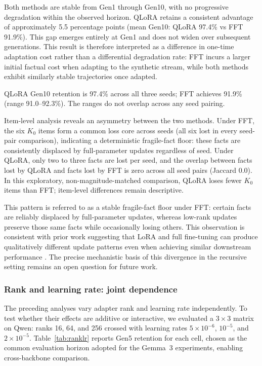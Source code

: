 \documentclass[a4paper,fleqn]{cas-dc}
\newif\ifshowchanges
\newcommand{\rev}[1]{\ifshowchanges{\color{blue}#1}\else{#1}\fi}
\begin{document}
Both methods are stable from Gen1 through Gen10, with no progressive degradation
within the observed horizon. QLoRA retains a consistent advantage of
approximately 5.5 percentage points (mean Gen10: QLoRA 97.4\% vs FFT 91.9\%).
This gap emerges entirely at Gen1 and does not widen over subsequent generations.
This result is therefore interpreted as a difference in one-time adaptation cost rather than
a differential degradation rate: FFT incurs a larger initial factual cost when
adapting to the synthetic stream, while both methods exhibit similarly stable
trajectories once adapted.

QLoRA Gen10 retention is 97.4\% across all three seeds; FFT achieves
91.9\% (range 91.0--92.3\%). The ranges do not overlap across any seed pairing.

Item-level analysis reveals an asymmetry between the two methods. Under FFT, the
\rev{six $K_0$ items form a common loss core across seeds (all six lost in every seed-pair comparison), indicating a deterministic fragile-fact floor:} these facts are
consistently displaced by full-parameter updates regardless of seed. Under
QLoRA, only two to three facts are lost per seed, and the overlap between facts
lost by QLoRA and facts lost by FFT is zero across all seed pairs (Jaccard 0.0).
\rev{In this exploratory, non-magnitude-matched comparison, QLoRA loses fewer $K_0$ items than FFT; item-level differences remain descriptive.}

This pattern is referred to as a stable fragile-fact floor under FFT: certain facts
are reliably displaced by full-parameter updates, whereas low-rank updates
preserve those same facts while occasionally losing others. This observation is
consistent with prior work suggesting that LoRA and full fine-tuning can produce
qualitatively different update patterns even when achieving similar downstream
performance \citep{shuttleworth2024illusion,biderman2024}. The precise
mechanistic basis of this divergence in the recursive setting remains an open
question for future work.

\subsubsection{\rev{Rank and learning rate: joint dependence}}

The preceding analyses vary adapter rank and learning rate independently. To
test whether their effects are additive or interactive, we evaluated a
$3 \times 3$ matrix on Qwen: ranks 16, 64, and 256 crossed with learning rates
$5 \times 10^{-6}$, $10^{-5}$, and $2 \times 10^{-5}$. Table~\ref{tab:ranklr}
reports Gen5 retention for each cell, chosen as the common evaluation horizon
adopted for the Gemma~3 experiments, enabling cross-backbone comparison.
\end{document}
